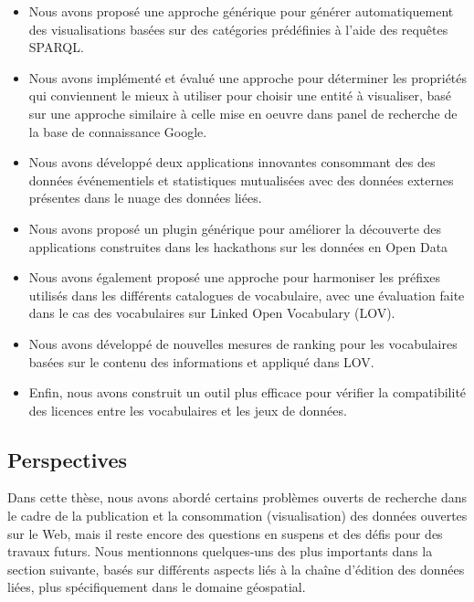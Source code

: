 \begin{itemize}
 \item Nous avons propos\'{e} une approche g\'{e}n\'{e}rique pour g\'{e}n\'{e}rer automatiquement des visualisations bas\'{e}es sur des cat\'{e}gories pr\'{e}d\'{e}finies à l'aide des requ\^{e}tes SPARQL.
 \item Nous avons impl\'{e}ment\'{e} et \'{e}valu\'{e} une approche pour d\'{e}terminer les propri\'{e}t\'{e}s qui conviennent le mieux à utiliser pour choisir une entit\'{e} à visualiser, bas\'{e} sur une approche similaire à celle mise en oeuvre dans panel de recherche de la base de connaissance Google.
 \item Nous avons d\'{e}velopp\'{e} deux applications innovantes consommant des des donn\'{e}es \'{e}v\'{e}nementiels et statistiques mutualis\'{e}es avec des donn\'{e}es externes pr\'{e}sentes dans le nuage des donn\'{e}es li\'{e}es.
 \item Nous avons propos\'{e} un plugin g\'{e}n\'{e}rique pour am\'{e}liorer la d\'{e}couverte des applications construites dans les hackathons sur les donn\'{e}es en Open Data
 \item Nous avons \'{e}galement propos\'{e} une approche pour harmoniser les pr\'{e}fixes utilis\'{e}s dans les diff\'{e}rents catalogues de vocabulaire, avec une \'{e}valuation faite dans le cas des vocabulaires  sur Linked Open Vocabulary (LOV).
 \item Nous avons d\'{e}velopp\'{e} de nouvelles mesures de ranking pour les vocabulaires bas\'{e}es sur le contenu des informations et appliqu\'{e} dans LOV.
 \item Enfin, nous avons construit un outil plus efficace pour v\'{e}rifier la compatibilit\'{e} des licences entre les vocabulaires et les jeux de donn\'{e}es.
\end{itemize}

\subsection*{Perspectives}
\label{sec:future}
Dans cette th\`{e}se, nous avons abord\'{e} certains probl\`{e}mes ouverts de recherche dans le cadre de la publication et la consommation (visualisation) des donn\'{e}es ouvertes sur le Web, mais il reste encore des questions en suspens et des d\'{e}fis pour des travaux futurs. Nous mentionnons quelques-uns des plus importants dans la section suivante, bas\'{e}s sur diff\'{e}rents aspects li\'{e}s à la chaîne d'\'{e}dition des donn\'{e}es li\'{e}es, plus sp\'{e}cifiquement dans le domaine g\'{e}ospatial.

